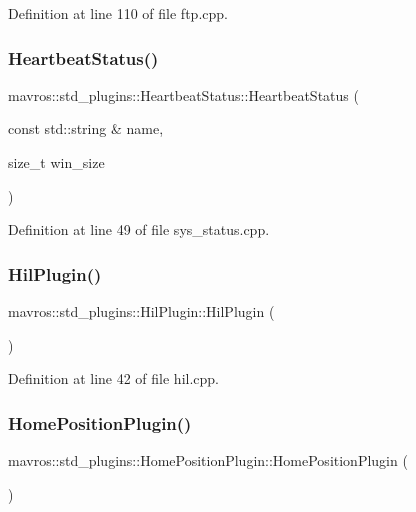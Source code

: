 Definition at line 110 of file ftp.\+cpp.

\mbox{\label{group__plugin_ga0039e2c63a99948b0ddc34d9a543d707}} 
\subsubsection{\texorpdfstring{HeartbeatStatus()}{HeartbeatStatus()}}
{\footnotesize\ttfamily mavros\+::std\+\_\+plugins\+::\+Heartbeat\+Status\+::\+Heartbeat\+Status (\begin{DoxyParamCaption}\item[{const std\+::string \&}]{name,  }\item[{size\+\_\+t}]{win\+\_\+size }\end{DoxyParamCaption})\hspace{0.3cm}{\ttfamily [inline]}}



Definition at line 49 of file sys\+\_\+status.\+cpp.

\mbox{\label{group__plugin_ga1c478bd6c8e29b4739d1687f1f4645aa}} 
\subsubsection{\texorpdfstring{HilPlugin()}{HilPlugin()}}
{\footnotesize\ttfamily mavros\+::std\+\_\+plugins\+::\+Hil\+Plugin\+::\+Hil\+Plugin (\begin{DoxyParamCaption}{ }\end{DoxyParamCaption})\hspace{0.3cm}{\ttfamily [inline]}}



Definition at line 42 of file hil.\+cpp.

\mbox{\label{group__plugin_gabfbef02bbcde71f9210b3289ace49100}} 
\subsubsection{\texorpdfstring{HomePositionPlugin()}{HomePositionPlugin()}}
{\footnotesize\ttfamily mavros\+::std\+\_\+plugins\+::\+Home\+Position\+Plugin\+::\+Home\+Position\+Plugin (\begin{DoxyParamCaption}{ }\end{DoxyParamCaption})\hspace{0.3cm}{\ttfamily [inline]}}



